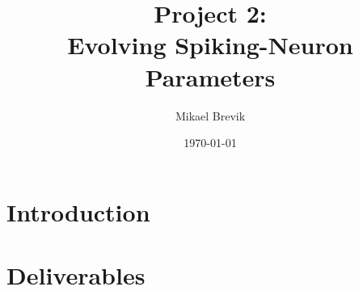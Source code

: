 \documentclass[a4paper, 11pt]{report}
\title{Project 2: \\ Evolving Spiking-Neuron Parameters}
\author{Mikael Brevik}
\date{\today}
\begin{document}
\maketitle
\tableofcontents



\chapter{Introduction}


\chapter{Deliverables}	

\newpage

\newpage






\listoffigures
\end{document}
